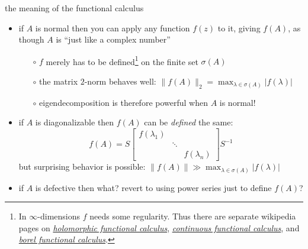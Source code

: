 \documentclass[10pt,hyperref]{beamer}
\begin{document}
\begin{frame}{the meaning of the functional calculus}

\begin{itemize}
\item if $A$ is normal then you can apply any function $f(z)$ to it, giving $f(A)$, as though $A$ is ``just like a complex number''
    \begin{itemize}
    \item[$\circ$] $f$ merely has to be defined\footnote{In $\infty$-dimensions $f$ needs some regularity.  Thus there are separate wikipedia pages on \href{https://en.wikipedia.org/wiki/Holomorphic_functional_calculus}{\emph{holomorphic functional calculus}}, \href{https://en.wikipedia.org/wiki/Continuous_functional_calculus}{\emph{continuous functional calculus}}, and \href{https://en.wikipedia.org/wiki/Borel_functional_calculus}{\emph{borel functional calculus}}.} on the finite set $\sigma(A)$
    \item[$\circ$] the matrix $2$-norm behaves well: $\|f(A)\|_2 = \max_{\lambda\in\sigma(A)} |f(\lambda)|$
    \item[$\circ$] eigendecomposition is therefore powerful when $A$ is normal!
    \end{itemize}
\item if $A$ is diagonalizable then $f(A)$ can be \emph{defined} the same:
\small
   $$f(A) = S \begin{bmatrix} f(\lambda_1) & & \\ & \ddots & \\ & & f(\lambda_n) \end{bmatrix} S^{-1}$$
\normalsize
but surprising behavior is possible: $\|f(A)\| \gg \max_{\lambda\in\sigma(A)} |f(\lambda)|$
\item if $A$ is defective then what?  revert to using power series just to define $f(A)$?
\end{itemize}
\end{frame}
\end{document}
